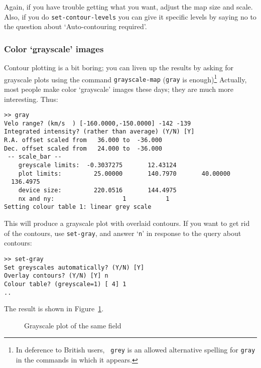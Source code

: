 Again, if you have trouble getting what you want, adjust the map size
and scale.  Also, if you do {\tt set-contour-levels} you can give it
specific levels by saying no to the question about `Auto-contouring
required'.

\subsubsection{Color `grayscale' images}
\label{sec:grayscale}
Contour plotting is a bit boring; you can liven up the results by
asking for grayscale plots using the command {\tt grayscale-map}
({\tt{gray}} is enough)\footnote{In deference to British users, {\tt
grey} is an allowed alternative spelling for {\tt gray} in the commands
in which it appears.}  Actually, most people make color `grayscale'
images these days; they are much more interesting. Thus:

\begin{verbatim}
>> gray
Velo range? (km/s  ) [-160.0000,-150.0000] -142 -139
Integrated intensity? (rather than average) (Y/N) [Y]
R.A. offset scaled from   36.000 to  -36.000
Dec. offset scaled from   24.000 to  -36.000
 -- scale_bar --
    greyscale limits:  -0.3037275       12.43124
    plot limits:         25.00000       140.7970       40.00000
  136.4975
    device size:         220.0516       144.4975
    nx and ny:                   1           1
Setting colour table 1: linear grey scale
\end{verbatim}

This will produce a grayscale plot with overlaid contours. If you want
to get rid of the contours, use {\tt set-gray}, and answer `{\tt n}'
in response to the query about contours:

\begin{verbatim}
>> set-gray
Set greyscales automatically? (Y/N) [Y]
Overlay contours? (Y/N) [Y] n
Colour table? (greyscale=1) [ 4] 1
..
\end{verbatim}

The result is shown in Figure~\ref{fig:specx_gray}.

\begin{figure}[htb]
\centering
\leavevmode
\epsfysize=5in
\vspace*{-0.5cm}
\begin{center}
\begin{minipage}[t]{4in}
\caption[A gray-scale plot with contours]
{\small{Grayscale plot of the same field}
}
\label{fig:specx_gray}
\end{minipage}
\end{center}
\end{figure}

